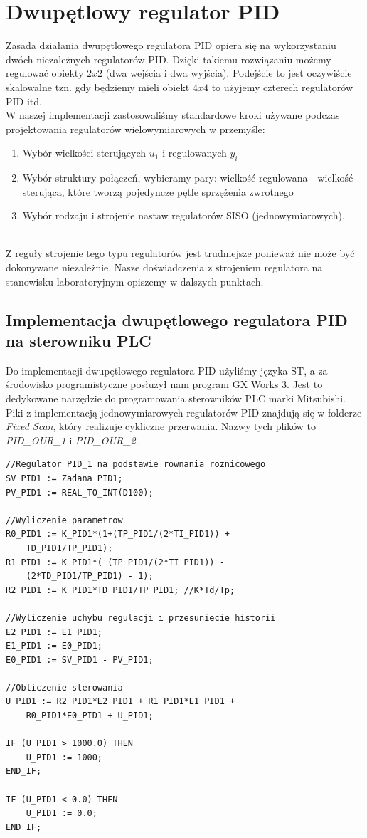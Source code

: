 \chapter{Dwupętlowy regulator PID}
\label{thermal_pid}
Zasada działania dwupętlowego regulatora PID opiera się na wykorzystaniu dwóch niezależnych regulatorów PID. Dzięki takiemu rozwiązaniu możemy regulować obiekty $2x2$ (dwa wejścia i dwa wyjścia). Podejście to jest oczywiście skalowalne tzn. gdy będziemy mieli obiekt $4x4$ to użyjemy czterech regulatorów PID itd. 
\\ \indent W naszej implementacji zastosowaliśmy standardowe kroki używane podczas projektowania regulatorów wielowymiarowych w przemyśle:
\begin{enumerate}
\item Wybór wielkości sterujących $u_{1}$ i regulowanych $y_{i}$
\item Wybór struktury połączeń, wybieramy pary: wielkość regulowana - wielkość sterująca, które tworzą pojedyncze pętle sprzężenia zwrotnego 
\item Wybór rodzaju i strojenie nastaw regulatorów SISO (jednowymiarowych). 
\end{enumerate}
~\\ Z reguły strojenie tego typu regulatorów jest trudniejsze ponieważ nie może być dokonywane niezależnie. Nasze doświadczenia z strojeniem regulatora na stanowisku laboratoryjnym opiszemy w dalszych punktach. 

\section{Implementacja dwupętlowego regulatora PID na sterowniku PLC}
\label{thermal_pid_impl}
Do implementacji dwupętlowego regulatora PID użyliśmy języka ST, a za środowisko programistyczne posłużył nam program GX Works 3. Jest to dedykowane narzędzie do programowania sterowników PLC marki Mitsubishi. Piki z implementacją jednowymiarowych regulatorów PID znajdują się w folderze \textit{Fixed Scan}, który realizuje cykliczne przerwania. Nazwy tych plików to \textit{PID\_OUR\_1} i \textit{PID\_OUR\_2}.
\begin{lstlisting}[caption={Kod pierwszego jednowymiarowego regulatora PID}]
//Regulator PID_1 na podstawie rownania roznicowego
SV_PID1 := Zadana_PID1;
PV_PID1 := REAL_TO_INT(D100);

//Wyliczenie parametrow
R0_PID1 := K_PID1*(1+(TP_PID1/(2*TI_PID1)) + 
    TD_PID1/TP_PID1); 
R1_PID1 := K_PID1*( (TP_PID1/(2*TI_PID1)) - 
    (2*TD_PID1/TP_PID1) - 1);
R2_PID1 := K_PID1*TD_PID1/TP_PID1; //K*Td/Tp;

//Wyliczenie uchybu regulacji i przesuniecie historii
E2_PID1 := E1_PID1;
E1_PID1 := E0_PID1;
E0_PID1 := SV_PID1 - PV_PID1;

//Obliczenie sterowania
U_PID1 := R2_PID1*E2_PID1 + R1_PID1*E1_PID1 + 
    R0_PID1*E0_PID1 + U_PID1;

IF (U_PID1 > 1000.0) THEN
	U_PID1 := 1000;
END_IF;	
		
IF (U_PID1 < 0.0) THEN
	U_PID1 := 0.0;
END_IF;

\end{lstlisting}

